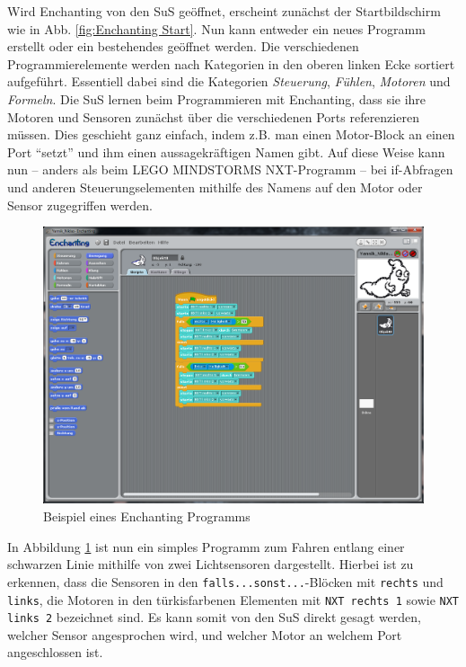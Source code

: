 \documentclass[paper=a4, pagesize, DIV=calc, BCOR=12.5mm, twoside=on, onecolumn=on, open = any, titlepage =on, parskip =half-, headsepline = on, footsepline = on, chapterprefix = on, appendixprefix = off, fontsize = 12pt, numbers = noenddot, abstract = on]{scrbook}
\numberwithin{equation}{chapter}
\theoremstyle{definition}
\theoremstyle{plain}
\theoremstyle{plain}
\theoremstyle{remark}
\theoremstyle{plain}
\theoremstyle{plain}
\begin{document}
Wird Enchanting von den SuS geöffnet, erscheint zunächst der Startbildschirm wie in Abb. \ref{fig:Enchanting Start}. Nun kann entweder ein neues Programm erstellt oder ein bestehendes geöffnet werden. Die verschiedenen Programmierelemente werden nach Kategorien in den oberen linken Ecke sortiert aufgeführt. Essentiell dabei sind die Kategorien \emph{Steuerung}, \emph{Fühlen}, \emph{Motoren} und \emph{Formeln}. Die SuS lernen beim Programmieren mit Enchanting, dass sie ihre Motoren und Sensoren zunächst über die verschiedenen Ports referenzieren müssen. Dies geschieht ganz einfach, indem z.B. man einen Motor-Block an einen Port "`setzt"' und ihm einen aussagekräftigen Namen gibt. Auf diese Weise kann nun -- anders als beim LEGO MINDSTORMS NXT-Programm -- bei if-Abfragen und anderen Steuerungselementen mithilfe des Namens auf den Motor oder Sensor zugegriffen werden.\\
\begin{figure}[htbp]
\centering
\includegraphics[scale=0.45]{images/Beispielprogramm_Enchanting.png} 
\caption{Beispiel eines Enchanting Programms}
\label{fig:Bsp Enchanting}
\end{figure}
In Abbildung \ref{fig:Bsp Enchanting} ist nun ein simples Programm zum Fahren entlang einer schwarzen Linie mithilfe von zwei Lichtsensoren dargestellt. Hierbei ist zu erkennen, dass die Sensoren in den \texttt{falls...sonst...}-Blöcken mit \texttt{rechts} und \texttt{links}, die Motoren in den türkisfarbenen Elementen mit \texttt{NXT rechts 1} sowie \texttt{NXT links 2} bezeichnet sind. Es kann somit von den SuS direkt gesagt werden, welcher Sensor angesprochen wird, und welcher Motor an welchem Port angeschlossen ist.
\end{document}
